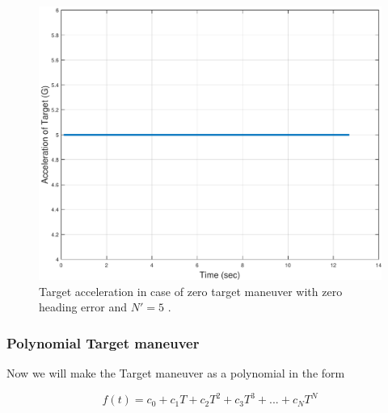 \begin{figure}[H]
	\centering
	\includegraphics[scale = 0.35]{fig/TargetAccelerationXNT5HE0N5.pdf}
	\caption{Target acceleration in case of zero target maneuver with zero heading error and $N'=5$ .}
	\label{Target accelerationXNT5HE0N5}
\end{figure}


\subsubsection{Polynomial Target maneuver}
Now we will make the Target maneuver as a polynomial in the form

\begin{equation}
	f(t) = c_0 + c_1 T + c_2 T^2 + c_3 T^3 + ... + c_N T^N
\end{equation} 

